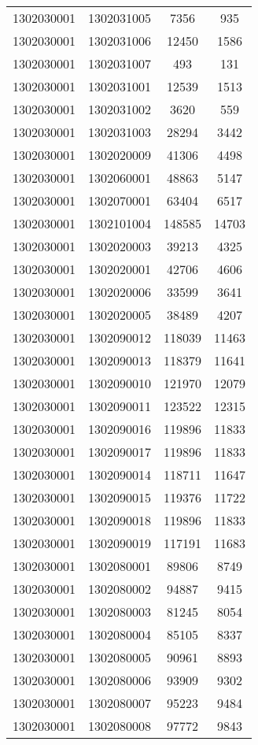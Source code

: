 \begin{longtable}{llcc}
1302030001 & 1302031005 & 7356 & 935\\
1302030001 & 1302031006 & 12450 & 1586\\
1302030001 & 1302031007 & 493 & 131\\
1302030001 & 1302031001 & 12539 & 1513\\
1302030001 & 1302031002 & 3620 & 559\\
1302030001 & 1302031003 & 28294 & 3442\\
1302030001 & 1302020009 & 41306 & 4498\\
1302030001 & 1302060001 & 48863 & 5147\\
1302030001 & 1302070001 & 63404 & 6517\\
1302030001 & 1302101004 & 148585 & 14703\\
1302030001 & 1302020003 & 39213 & 4325\\
1302030001 & 1302020001 & 42706 & 4606\\
1302030001 & 1302020006 & 33599 & 3641\\
1302030001 & 1302020005 & 38489 & 4207\\
1302030001 & 1302090012 & 118039 & 11463\\
1302030001 & 1302090013 & 118379 & 11641\\
1302030001 & 1302090010 & 121970 & 12079\\
1302030001 & 1302090011 & 123522 & 12315\\
1302030001 & 1302090016 & 119896 & 11833\\
1302030001 & 1302090017 & 119896 & 11833\\
1302030001 & 1302090014 & 118711 & 11647\\
1302030001 & 1302090015 & 119376 & 11722\\
1302030001 & 1302090018 & 119896 & 11833\\
1302030001 & 1302090019 & 117191 & 11683\\
1302030001 & 1302080001 & 89806 & 8749\\
1302030001 & 1302080002 & 94887 & 9415\\
1302030001 & 1302080003 & 81245 & 8054\\
1302030001 & 1302080004 & 85105 & 8337\\
1302030001 & 1302080005 & 90961 & 8893\\
1302030001 & 1302080006 & 93909 & 9302\\
1302030001 & 1302080007 & 95223 & 9484\\
1302030001 & 1302080008 & 97772 & 9843\\

\end{longtable}
